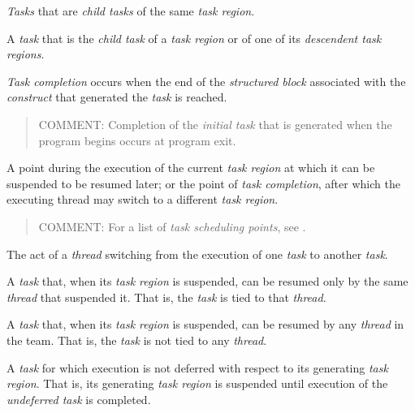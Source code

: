 \glossarydefstart
\emph{Tasks} that are \emph{child tasks} of the same \emph{task region}.
\glossarydefend

\glossarydefstart
A \emph{task} that is the \emph{child task} of a \emph{task region} or of one of its 
\emph{descendent task regions}.
\glossarydefend

\glossarydefstart
\emph{Task completion} occurs when the end of the \emph{structured block} associated with the 
\emph{construct} that generated the \emph{task} is reached.

\begin{quote}
COMMENT: Completion of the \emph{initial task} that is generated when the program begins occurs at program exit.
\end{quote}
\glossarydefend

\glossarydefstart
A point during the execution of the current \emph{task region} at which it can be 
suspended to be resumed later; or the point of \emph{task completion}, after which the 
executing thread may switch to a different \emph{task region}. 

\begin{quote}
COMMENT: For a list of \emph{task scheduling points}, see .
\end{quote}
\glossarydefend

\glossarydefstart
The act of a \emph{thread} switching from the execution of one \emph{task} to another \emph{task}.
\glossarydefend

\glossarydefstart
A \emph{task} that, when its \emph{task region} is suspended, can be resumed only by the same 
\emph{thread} that suspended it. That is, the \emph{task} is tied to that \emph{thread}. 
\glossarydefend

\glossarydefstart
A \emph{task} that, when its \emph{task region} is suspended, can be resumed by any \emph{thread} in 
the team. That is, the \emph{task} is not tied to any \emph{thread}. 
\glossarydefend

\glossarydefstart
A \emph{task} for which execution is not deferred with respect to its generating \emph{task} 
\emph{region}. That is, its generating \emph{task region} is suspended until execution of the 
\emph{undeferred task} is completed.
\glossarydefend

